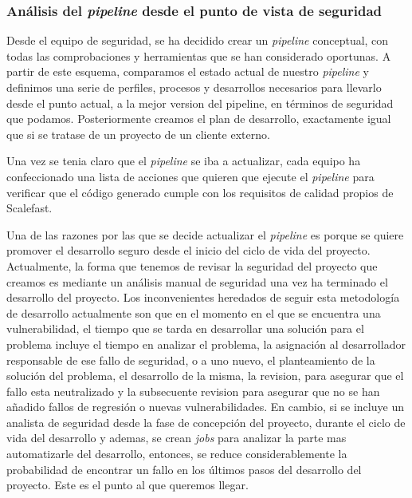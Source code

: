 \documentclass[12pt]{report} %
\begin{document}
\subsubsection{Análisis del \textit{\gls{pipeline}} desde el punto de vista de
seguridad}

Desde el equipo de seguridad, se ha decidido crear un \textit{\gls{pipeline}}
conceptual, con todas las comprobaciones y herramientas que se han considerado
oportunas.  A partir de este esquema, comparamos el estado actual de nuestro
\textit{\gls{pipeline}} y definimos una serie de perfiles, procesos y
desarrollos necesarios para llevarlo desde el punto actual, a la mejor version
del pipeline, en términos de seguridad que podamos.  Posteriormente creamos el
plan de desarrollo, exactamente igual que si se tratase de un proyecto de un
cliente externo.

Una vez se tenia claro que el \textit{\gls{pipeline}} se iba a actualizar, cada
equipo ha confeccionado una lista de acciones que quieren que ejecute el
\textit{\gls{pipeline}} para verificar que el código generado cumple con los
requisitos de calidad propios de Scalefast.

Una de las razones por las que se decide actualizar el \textit{\gls{pipeline}}
es porque se quiere promover el desarrollo seguro desde el inicio del ciclo de
vida del proyecto.  Actualmente, la forma que tenemos de revisar la seguridad
del proyecto que creamos es mediante un análisis manual de seguridad una vez ha
terminado el desarrollo del proyecto.  Los inconvenientes heredados de seguir
esta metodología de desarrollo actualmente son que en el momento en el que se
encuentra una vulnerabilidad, el tiempo que se tarda en desarrollar una solución
para el problema incluye el tiempo en analizar el problema, la asignación al
desarrollador responsable de ese fallo de seguridad, o a uno nuevo, el
planteamiento de la solución del problema, el desarrollo de la misma, la
revision, para asegurar que el fallo esta neutralizado y la subsecuente revision
para asegurar que no se han añadido fallos de regresión o nuevas
vulnerabilidades.  En cambio, si se incluye un analista de seguridad desde la
fase de concepción del proyecto, durante el ciclo de vida del desarrollo y
ademas, se crean \textit{\gls{job}s} para analizar la parte mas automatizarle
del desarrollo, entonces, se reduce considerablemente la probabilidad de
encontrar un fallo en los últimos pasos del desarrollo del proyecto.  Este es el
punto al que queremos llegar.
\end{document}
